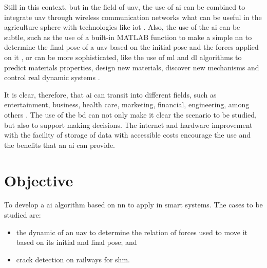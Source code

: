 Still in this context, but in the field of \gls*{uav}, the use of \gls*{ai} can be combined to integrate \gls*{uav} through wireless communication networks \citep{lahmeri2021} what can be useful in the agriculture sphere \citep{ahirwar2019} with technologies like \gls*{iot} \citep{verdouw2016,tzounis2017}.
Also, the use of the \gls*{ai} can be subtle, such as the use of a built-in MATLAB function to make a simple \gls*{nn} to determine the final pose of a \gls*{uav} based on the initial pose and the forces applied on it \citep{geronel2023}, or can be more sophisticated, like the use of \gls*{ml} and \gls*{dl} algorithms to predict materials properties, design new materials, discover new mechanisms and control real dynamic systems \citep{guo2021,assilian1974}.

It is clear, therefore, that \gls*{ai} can transit into different fields, such as entertainment, business, health care, marketing, financial, engineering, among others \citep{pannu2015}. The use of the \gls*{bd} can not only make it clear the scenario to be studied, but also to support making decisions. The internet and hardware improvement \citep{baji2018} with the facility of storage of data with accessible costs encourage the use and the benefits that an \gls*{ai} can provide.

\section{Objective}

To develop a \gls*{ai} algorithm based on \gls*{nn} to apply in smart systems. The cases to be studied are: 
%
\begin{itemize}
    \item the dynamic of an \gls*{uav} to determine the relation of forces used to move it based on its initial and final pose; and
    \item crack detection on railways for \gls*{shm}.
\end{itemize}